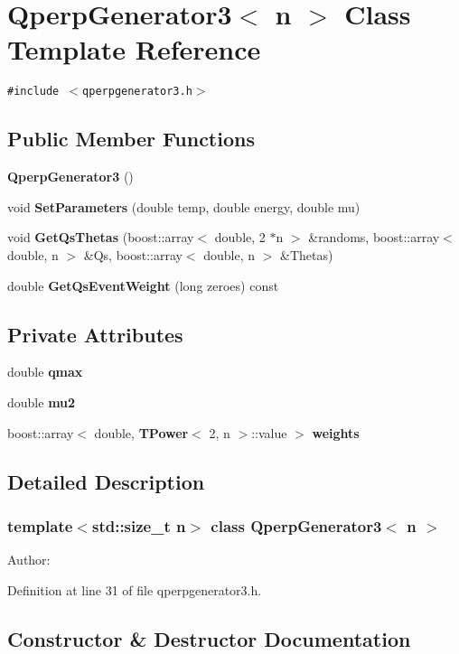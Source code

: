 \section{QperpGenerator3$<$ n $>$ Class Template Reference}
\label{classQperpGenerator3}
{\tt \#include $<$qperpgenerator3.h$>$}

\subsection*{Public Member Functions}
\begin{CompactItemize}
\item 
{\bf QperpGenerator3} ()
\item 
void {\bf SetParameters} (double temp, double energy, double mu)
\item 
void {\bf GetQsThetas} (boost::array$<$ double, 2 $\ast$n $>$ \&randoms, boost::array$<$ double, n $>$ \&Qs, boost::array$<$ double, n $>$ \&Thetas)
\item 
double {\bf GetQsEventWeight} (long zeroes) const 
\end{CompactItemize}
\subsection*{Private Attributes}
\begin{CompactItemize}
\item 
double {\bf qmax}
\item 
double {\bf mu2}
\item 
boost::array$<$ double, {\bf TPower}$<$ 2, n $>$::value $>$ {\bf weights}
\end{CompactItemize}


\subsection{Detailed Description}
\subsubsection*{template$<$std::size\_\-t n$>$ class QperpGenerator3$<$ n $>$}

\begin{Desc}
\item[Author:]\end{Desc}


Definition at line 31 of file qperpgenerator3.h.

\subsection{Constructor \& Destructor Documentation}
